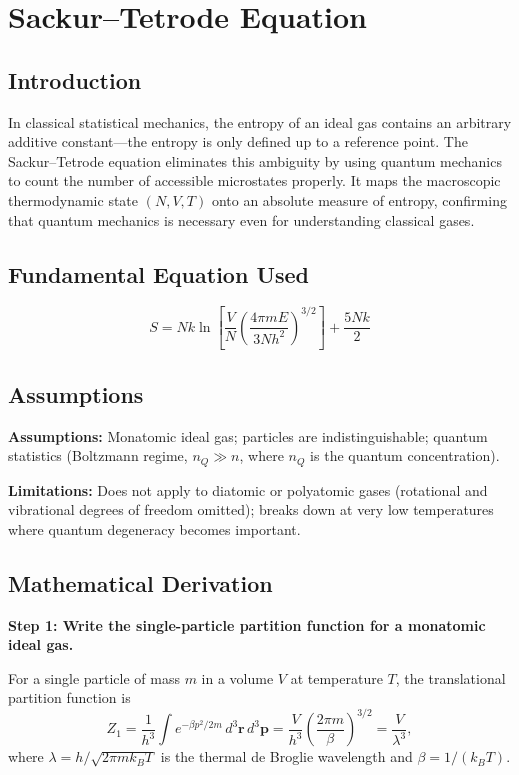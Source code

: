 \chapter{Sackur--Tetrode Equation}

\section*{Introduction}

In classical statistical mechanics, the entropy of an ideal gas contains an arbitrary additive constant---the entropy is only defined up to a reference point. The Sackur--Tetrode equation eliminates this ambiguity by using quantum mechanics to count the number of accessible microstates properly. It maps the macroscopic thermodynamic state $(N, V, T)$ onto an absolute measure of entropy, confirming that quantum mechanics is necessary even for understanding classical gases.
\section*{Fundamental Equation Used}

\begin{equation}
S = Nk\ln\left[\frac{V}{N}\left(\frac{4\pi m E}{3Nh^2}\right)^{3/2}\right] + \frac{5Nk}{2}
\end{equation}
\section*{Assumptions}

\textbf{Assumptions:} Monatomic ideal gas; particles are indistinguishable; quantum statistics (Boltzmann regime, $n_Q \gg n$, where $n_Q$ is the quantum concentration).


\textbf{Limitations:} Does not apply to diatomic or polyatomic gases (rotational and vibrational degrees of freedom omitted); breaks down at very low temperatures where quantum degeneracy becomes important.


\section*{Mathematical Derivation}

\textbf{Step 1: Write the single-particle partition function for a monatomic ideal gas.}

For a single particle of mass $m$ in a volume $V$ at temperature $T$, the translational partition function is
\begin{equation}
Z_1 = \frac{1}{h^3}\int e^{-\beta p^2/2m}\,d^3\mathbf{r}\,d^3\mathbf{p} = \frac{V}{h^3}\left(\frac{2\pi m}{\beta}\right)^{3/2} = \frac{V}{\lambda^3},
\end{equation}
where $\lambda = h/\sqrt{2\pi m k_B T}$ is the thermal de Broglie wavelength and $\beta = 1/(k_BT)$.

